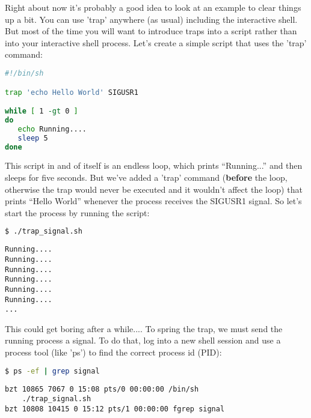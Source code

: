 Right about now it's probably a good idea to look at an example to clear things
up a bit. You can use 'trap' anywhere (as usual) including the interactive
shell. But most of the time you will want to introduce traps into a script
rather than into your interactive shell process. Let's create a simple script
that uses the 'trap' command:


\lstset{basicstyle=\scriptsize, numbers=left, captionpos=b, tabsize=4}
\begin{lstlisting}[caption=A simple signal trap,language={bash},
breaklines=true,xleftmargin=15pt,label=lst:A simple signal trap]
#!/bin/sh

trap 'echo Hello World' SIGUSR1

while [ 1 -gt 0 ]
do
   echo Running....
   sleep 5
done
\end{lstlisting}

This script in and of itself is an endless loop, which prints ``Running...''
and then sleeps for five seconds. But we've added a 'trap' command
(\textbf{before} the loop, otherwise the trap would never be executed and it
wouldn't affect the loop) that prints ``Hello World'' whenever the process
receives the SIGUSR1 signal. So let's start the process by running the script:

\lstset{basicstyle=\scriptsize, numbers=left, captionpos=b, tabsize=4}
\begin{lstlisting}[caption=Infinite loop...,language={bash},
breaklines=true,xleftmargin=15pt,label=lst:Infinite loop...]
$ ./trap_signal.sh
\end{lstlisting}

\scriptsize
\begin{verbatim}
Running....
Running....
Running....
Running....
Running....
Running....
...
\end{verbatim}
\normalsize

This could get boring after a while....
To spring the trap, we must send the running process a signal. To do that, log
into a new shell session and use a process tool (like 'ps') to find the correct
process id (PID):

\lstset{basicstyle=\scriptsize, numbers=left, captionpos=b, tabsize=4}
\begin{lstlisting}[caption=Finding the process ID,language={bash},
breaklines=true,xleftmargin=15pt,label=lst:Finding the process ID]
$ ps -ef | grep signal
\end{lstlisting}

\scriptsize
\begin{verbatim}
bzt 10865 7067 0 15:08 pts/0 00:00:00 /bin/sh 
    ./trap_signal.sh
bzt 10808 10415 0 15:12 pts/1 00:00:00 fgrep signal
\end{verbatim}
\normalsize

